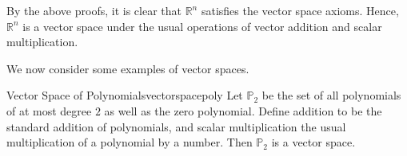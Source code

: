 \begin{solution}
By the above proofs, it is clear that $\mathbb{R}^n$ satisfies the vector space axioms. Hence, $\mathbb{R}^n$ is a vector space under the usual operations of vector addition and scalar multiplication. 
\end{solution}

We now consider some examples of vector spaces. 

\begin{example}{Vector Space of Polynomials}{vectorspacepoly}
Let $\mathbb{P}_2$ be the set of all polynomials of at most degree $2$ as well as the zero polynomial. Define addition to be the standard addition of polynomials, and scalar multiplication the usual multiplication of a polynomial by a number. Then $\mathbb{P}_2$ is a vector space. 
\end{example}

